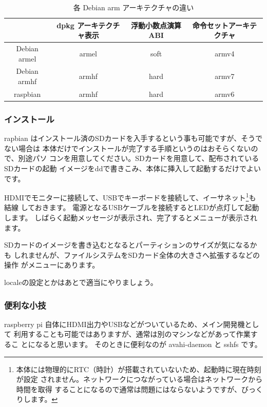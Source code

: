 \documentclass[mingoth,a4paper]{jsarticle}
\begin{document}
\begin{table}[ht]
\begin{center}
\caption{各 Debian arm アーキテクチャの違い}
  \begin{tabular}{|c|c|c|c|}
 \hline
 & dpkg アーキテクチャ表示 & 浮動小数点演算ABI & 命令セットアーキテクチャ\\
 \hline
   Debian armel & armel & soft & armv4 \\
   Debian armhf & armhf & hard & armv7 \\
   raspbian & armhf & hard & armv6 \\
 \hline
 \end{tabular}
\end{center}
\end{table}

\subsubsection{インストール}

rapbian はインストール済のSDカードを入手するという事も可能ですが、そうでない場合は
本体だけでインストールが完了する手順というのはおそらくないので、別途パソ
コンを用意してください。SDカードを用意して、配布されているSDカードの起動
イメージをddで書きこみ、本体に挿入して起動するだけでよいです。
\cite{raspberrypidownloads, raspbian}

HDMIでモニターに接続して、USBでキーボードを接続して、イーサネット\footnote{
本体には物理的にRTC（時計）が搭載されていないため、起動時に現在時刻が設定
されません。ネットワークにつながっている場合はネットワークから時間を取得
することになるので通常は問題にはならないようですが、びっくりします。
}も結線
しておきます。
電源となるUSBケーブルを接続するとLEDが点灯して起動します。
しばらく起動メッセージが表示され、完了するとメニューが表示されます。

SDカードのイメージを書き込むとなるとパーティションのサイズが気になるかも
しれませんが、ファイルシステムをSDカード全体の大きさへ拡張するなどの操作
がメニューにあります。

localeの設定とかはあとで適当にやりましょう。

\subsubsection{便利な小技}

raspberry pi 自体にHDMI出力やUSBなどがついているため、メイン開発機として
利用することも可能ではありますが、通常は別のマシンなどがあって作業するこ
とになると思います。
そのときに便利なのが avahi-daemon と sshfs です。
\end{document}
